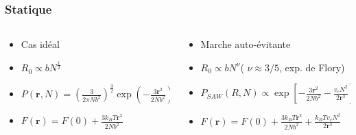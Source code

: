 \documentclass{beamer}
\begin{document}
\frame %
{
  \frametitle{Statique}

\begin{columns}
 \begin{column}{0.55\textwidth}

\begin{itemize}

 \item<1-> Cas idéal
 \medskip

 
 \item<2->$R_0\propto b N^{\frac{1}{2}} $
 \medskip
 
 \item<3->$P(\textbf{r},N)=\left(\frac{3}{2\pi N b^2}\right)^\frac{3}{2}\exp\left(-\frac{3\textbf{r}^2}{2 N b^2}\right)$
 \medskip
 \item<4->$F(\textbf{r})= F(0)+\frac{3k_BT\textbf{r}^2}{2Nb^2}$


\end{itemize}
 
\end{column}
 
\begin{column}{0.55\textwidth}

\begin{itemize}


\item<1-> Marche auto-évitante
\medskip

 
 \item<2->$R_0\propto b N^\nu $( $\nu \approx 3/5$, exp. de Flory)
 \medskip
 
 \item<3->$P_{SAW}(R,N) \propto \exp\left[-\frac{3\textbf{r}^2}{2 N b^2}-\frac{v_cN^2}{2\textbf{r}^3}\right]$
 \medskip
 
 \item<4->$F(\textbf{r})= F(0)+\frac{3k_BT\textbf{r}^2}{2Nb^2}+\frac{k_BTv_cN^2}{2\textbf{r}^3}$


\end{itemize}
 
\end{column}
\end{columns}
}
\end{document}
